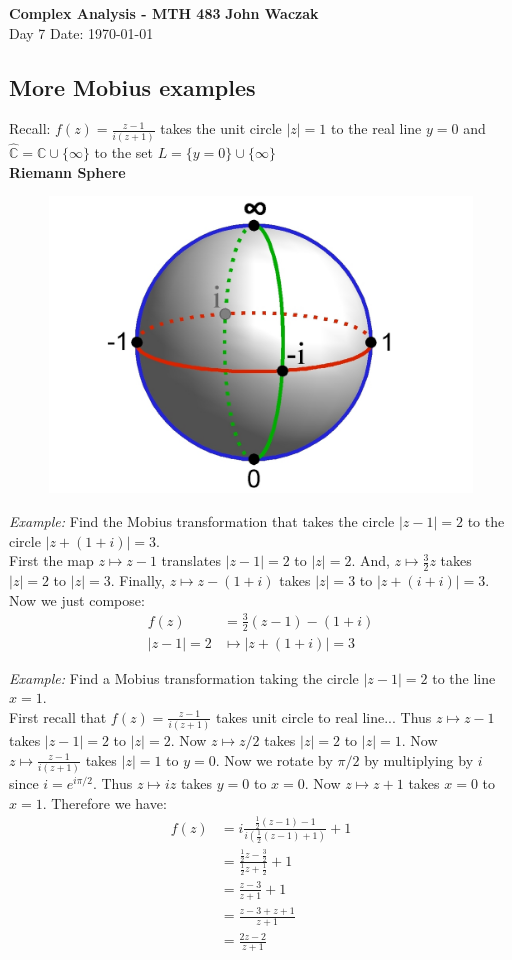 \documentclass[a4paper, 11pt]{article}
\begin{document}
\noindent
\large\textbf{Complex Analysis - MTH 483} \hfill \textbf{John Waczak} \\
\normalsize Day 7 \hfill  Date: \today \\

\subsection*{More Mobius examples}
Recall: $f(z) = \frac{z-1}{i(z+1)}$ takes the unit circle $|z|=1$ to the real line $y=0$ and $\hat{\mathbb{C}} = \mathbb{C} \cup \{\infty\}$ to the set $L = \{y=0\}\cup\{\infty\}$\\

\noindent \textbf{Riemann Sphere}
	\begin{figure}[!hbt]
		\centering
		\includegraphics[width = 0.55\columnwidth]{riemannSphere}
	\end{figure}

\noindent\textit{Example:} Find the Mobius transformation that takes the circle $|z-1|=2$ to the circle $|z+(1+i)|=3$. \\

First the map $z\mapsto z-1$ translates $|z-1|=2$ to $|z|=2$. And, $z\mapsto \frac{3}{2}z$ takes $|z|=2$ to $|z|=3$. Finally, $z\mapsto z-(1+i)$ takes $|z|=3$ to $|z+(i+i)|=3$. Now we just compose:
	\begin{align*}
		f(z) &= \frac{3}{2}(z-1)-(1+i) \\
		|z-1|=2 &\mapsto |z+(1+i)|=3 
	\end{align*}

\noindent \textit{Example:} Find a Mobius transformation taking the circle $|z-1|=2$ to the line $x = 1$. \\

First recall that $f(z) = \frac{z-1}{i(z+1)}$ takes unit circle to real line... Thus $z\mapsto z-1$ takes $|z-1|=2$ to $|z|=2$. Now $z\mapsto z/2$ takes $|z|=2$ to $|z|=1$. Now $z \mapsto \frac{z-1}{i(z+1)}$ takes $|z|=1$ to $y=0$. Now we rotate by $\pi/2$ by multiplying by $i$ since $i=e^{i\pi/2}$. Thus $z\mapsto iz$ takes $y=0$ to $x=0$. Now $z\mapsto z+1$ takes $x=0$ to $x=1$. Therefore we have:
	\begin{align*}
		f(z) &= i\frac{\frac{1}{2}(z-1)-1}{i(\frac{1}{2}(z-1)+1)}+1\\
			&= \frac{\frac{1}{2}z-\frac{3}{2}}{\frac{1}{2}z+\frac{1}{2}}+1 \\ 
			&= \frac{z-3}{z+1}+1 \\ 
			&= \frac{z-3+z+1}{z+1} \\ 
			&= \frac{2z-2}{z+1}
	\end{align*}
\end{document}
